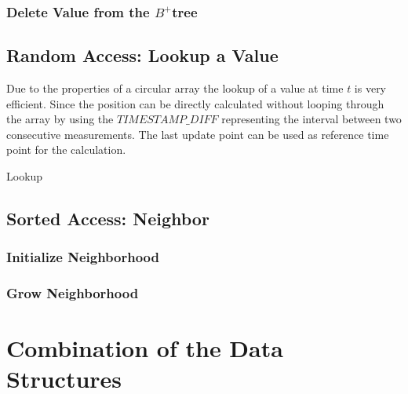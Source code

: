 \documentclass[abstracton,12pt]{scrreprt}
\begin{document}
\subsubsection{Delete Value from the $B^+$tree}




\subsection{Random Access: Lookup a Value}
Due to the properties of a circular array the lookup of a value at time $t$ is very efficient. Since the position can be directly calculated without looping through the array by using the $TIMESTAMP\_DIFF$ representing the interval between two consecutive measurements. The last update point can be used as reference time point for the calculation. 
\begin{algorithm}[H]
	
	\caption{Lookup}
\end{algorithm}

\subsection{Sorted Access: Neighbor}

\subsubsection{Initialize Neighborhood}

\subsubsection{Grow Neighborhood}



\newpage
\section{Combination of the Data Structures}
\label{sec:das}
\end{document}
